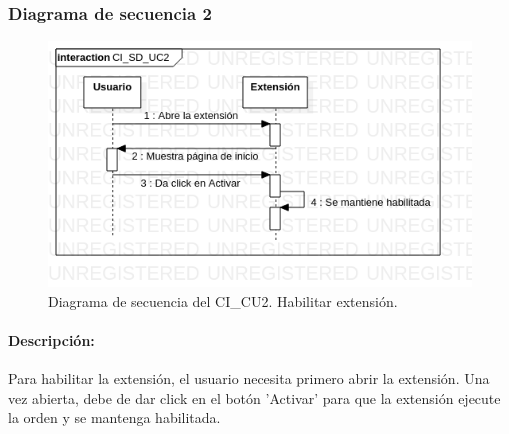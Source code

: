 \documentclass[12pt, a4paper, titlepage]{report}
\begin{document}
    		     \subsubsection{Diagrama de secuencia 2}
    			    \begin{figure}[H]
    				    \begin{center} \includegraphics[width=15cm]{./imagenes/Disenio/Componente_1/CI_SD_UC2.png}
    				    \caption[Diagrama de secuencia 2 del Componente I]{Diagrama de secuencia del CI\_CU2. Habilitar extensión.}
    			        \end{center}
    			    \end{figure}
    			    
    			    \paragraph{Descripción:}
    			    Para habilitar la extensión, el usuario necesita primero abrir la extensión. Una vez abierta, debe de dar click en el botón 'Activar' para que la extensión ejecute la orden y se mantenga habilitada.
    			    
    			
\end{document}
